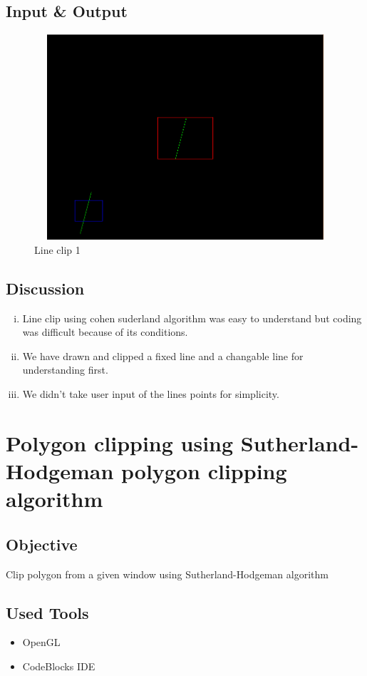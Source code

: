 \documentclass[11pt]{report}
\begin{document}
\section{Input \& Output}
\begin{figure}[h!]
	\centering
	\includegraphics[height=3.0in, width=5in]{lineclip_1}
	\caption{Line clip 1}
\end{figure}
\section{Discussion}
\begin{enumerate}[(i)]
	\item Line clip using cohen suderland algorithm was easy to understand but coding was difficult because of its conditions.
	\item We have drawn and clipped a fixed line and a changable line for understanding first.
	\item We didn't take user input of the lines points for simplicity.
\end{enumerate}




\chapter{Polygon clipping using Sutherland-\newline Hodgeman polygon clipping algorithm}
\section{Objective}
Clip polygon from a given window using Sutherland-Hodgeman algorithm
\section{Used Tools}
\begin{itemize}
	\item OpenGL
	\item CodeBlocks IDE
\end{itemize}
\end{document}
